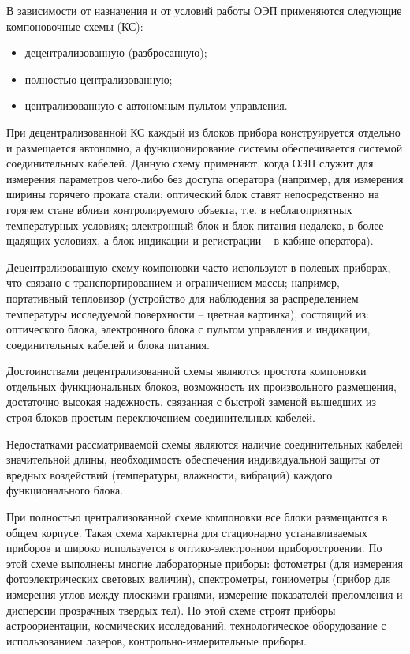 В зависимости от назначения и от условий работы ОЭП применяются следующие компоновочные схемы (КС):
\begin{itemize}
	\item децентрализованную (разбросанную);
	\item полностью централизованную;
	\item централизованную с автономным пультом управления.
\end{itemize}

При децентрализованной КС каждый из блоков прибора конструируется отдельно и размещается автономно, а функционирование системы обеспечивается системой соединительных кабелей. Данную схему применяют, когда ОЭП служит для измерения параметров чего-либо без доступа оператора (например, для измерения ширины горячего проката стали: оптический блок ставят непосредственно на горячем стане вблизи контролируемого объекта, т.е. в неблагоприятных температурных условиях; электронный блок и блок питания недалеко, в более щадящих условиях, а блок индикации и регистрации -- в кабине оператора).

Децентрализованную схему компоновки часто используют в полевых приборах, что связано с транспортированием и ограничением массы; например, портативный тепловизор (устройство для наблюдения за распределением температуры исследуемой поверхности -- цветная картинка), состоящий из: оптического блока, электронного блока с пультом управления и индикации, соединительных кабелей и блока питания.

Достоинствами децентрализованной схемы являются простота компоновки отдельных функциональных блоков, возможность их произвольного размещения, достаточно высокая надежность, связанная с быстрой заменой вышедших из строя блоков простым переключением соединительных кабелей.
 
Недостатками рассматриваемой схемы являются наличие соединительных кабелей значительной длины, необходимость обеспечения индивидуальной защиты от вредных воздействий (температуры, влажности, вибраций) каждого функционального блока.

При полностью централизованной схеме компоновки все блоки размещаются в общем корпусе. Такая схема характерна для стационарно устанавливаемых приборов и широко используется в оптико-электронном приборостроении. По этой схеме выполнены многие лабораторные приборы: фотометры (для измерения фотоэлектрических световых величин), спектрометры, гониометры (прибор для измерения углов между плоскими гранями, измерение показателей преломления и дисперсии прозрачных твердых тел). По этой схеме строят приборы астроориентации, космических исследований, технологическое оборудование с использованием лазеров, контрольно-измерительные приборы.

